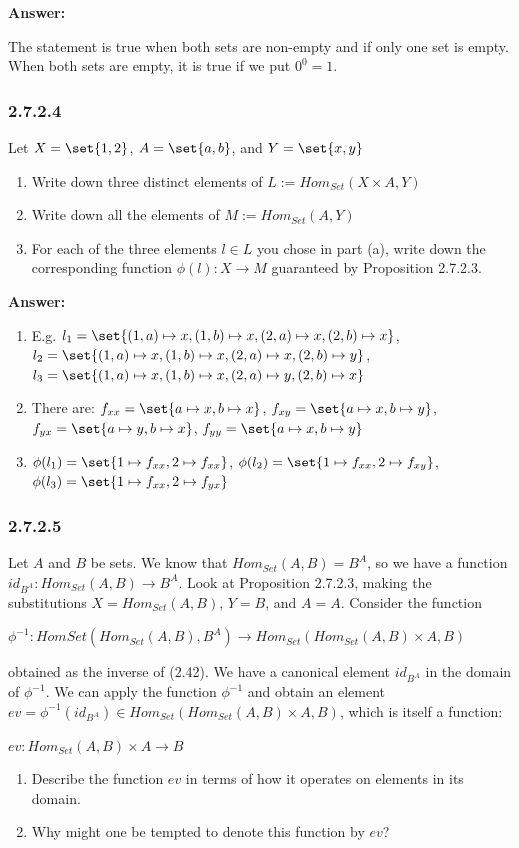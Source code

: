 \documentclass{article}
\newcommand{\vsp}[0]{\vspace*{10pt}\par}
\newcommand{\exercise}[1]{\subsubsection*{#1}}
\newcommand{\ans}[0]{\vsp\textbf{Answer: }\vsp}
\newcommand{\ei}{\item}
\newcommand{\eb}{\begin{enumerate}[label=(\alph*)]\ei}
\newcommand{\ee}{\end{enumerate}}
\begin{document}
\ans

The statement is true when both sets are non-empty and if only one set is empty.
When both sets are empty, it is true if we put $0^0 = 1$.

\exercise{2.7.2.4}

Let $X = \set{1, 2}$, $A = \set{a, b}$, and $Y = \set{x, y}$

\eb Write down three distinct elements of $L := Hom_{Set}(X \times A, Y)$
\ei Write down all the elements of $M := Hom_{Set}(A, Y)$
\ei For each of the three elements $l \in L$ you chose in part (a), write down
    the corresponding function $\phi(l): X \to M$ guaranteed by Proposition
    2.7.2.3.
\ee

\ans

\eb E.g.
    $l_1 = \set{(1,a) \mapsto x, (1,b) \mapsto x, (2,a) \mapsto x, (2,b) \mapsto x}$,
    $l_2 = \set{(1,a) \mapsto x, (1,b) \mapsto x, (2,a) \mapsto x, (2,b) \mapsto y}$,
    $l_3 = \set{(1,a) \mapsto x, (1,b) \mapsto x, (2,a) \mapsto y, (2,b) \mapsto x}$
\ei There are:
    $f_{xx} = \set{a \mapsto x, b \mapsto x}$,
    $f_{xy} = \set{a \mapsto x, b \mapsto y}$,
    $f_{yx} = \set{a \mapsto y, b \mapsto x}$,
    $f_{yy} = \set{a \mapsto x, b \mapsto y}$
\ei $\phi(l_1) = \set{1 \mapsto f_{xx}, 2 \mapsto f_{xx}}$,
    $\phi(l_2) = \set{1 \mapsto f_{xx}, 2 \mapsto f_{xy}}$,
    $\phi(l_3) = \set{1 \mapsto f_{xx}, 2 \mapsto f_{yx}}$
\ee

\exercise{2.7.2.5}

Let $A$ and $B$ be sets.  We know that $Hom_{Set}(A, B) = B^A$, so we have a
function $id_{B^A} : Hom_{Set}(A, B) \to B^A$. Look at Proposition 2.7.2.3,
making the substitutions $X = Hom_{Set}(A, B)$, $Y = B$, and $A = A$. Consider
the function

\vsp

$\phi^{-1} : Hom{Set}(Hom_{Set}(A, B), B^A) \to Hom_{Set}(Hom_{Set}(A, B) \times A, B)$

\vsp

obtained as the inverse of (2.42).  We have a canonical element $id_{B^A}$ in
the domain of $\phi^{-1}$.  We can apply the function $\phi^{-1}$ and obtain an
element $ev = \phi^{-1}(id_{B^A}) \in Hom_{Set}(Hom_{Set}(A, B) \times A, B)$,
which is itself a function:

\vsp
$ev: Hom_{Set}(A, B) \times A \to B$
\vsp

\eb Describe the function $ev$ in terms of how it operates on elements in its domain.
\ei Why might one be tempted to denote this function by $ev$?
\ee
\end{document}

